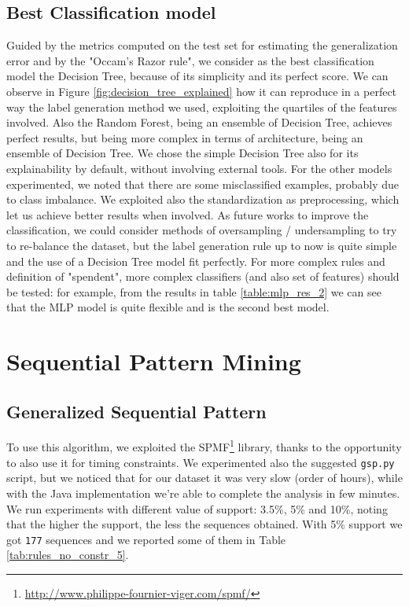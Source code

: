 \documentclass[12pt]{article}
\begin{document}
\subsection{Best Classification model}

Guided by the metrics computed on the test set for estimating the generalization error and by the "Occam’s Razor rule", we consider as the best classification model the Decision Tree, because of its simplicity and its perfect score. We can observe in Figure \ref{fig:decision_tree_explained} how it can reproduce in a perfect way the label generation method we used, exploiting the quartiles of the features involved. Also the Random Forest, being an ensemble of Decision Tree, achieves perfect results, but being more complex in terms of architecture, being an ensemble of Decision Tree. We chose the simple Decision Tree also for its explainability by default, without involving external tools.
For the other models experimented, we noted that there are some misclassified examples, probably due to class imbalance. We exploited also the standardization as preprocessing, which let us achieve better results when involved. As future works to improve the classification, we could consider methods of oversampling / undersampling to try to re-balance the dataset, but the label generation rule up to now is quite simple and the use of a Decision Tree model fit perfectly. For more complex rules and definition of "spendent", more complex classifiers (and also set of features) should be tested: for example, from the results in table \ref{table:mlp_res_2} we can see that the MLP model is quite flexible and is the second best model.

\section{Sequential Pattern Mining}
\subsection{Generalized Sequential Pattern}
To use this algorithm, we exploited the \textsc{SPMF}\footnote{\url{http://www.philippe-fournier-viger.com/spmf/}} library, thanks to the opportunity to also use it for timing constraints. We experimented also the suggested \texttt{gsp.py} script, but we noticed that for our dataset it was very slow (order of hours), while with the Java implementation we're able to complete the analysis in few minutes.\\
We run experiments with different value of support: 3.5\%, 5\% and 10\%, noting that the higher the support, the less the sequences obtained.
With 5\% support we got \texttt{177} sequences and we reported some of them in Table \ref{tab:rules_no_constr_5}.
\end{document}
